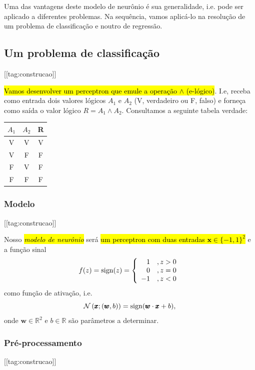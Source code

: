 Uma das vantagens deste modelo de neurônio é sua generalidade, i.e. pode ser aplicado a diferentes problemas. Na sequência, vamos aplicá-lo na resolução de um problema de classificação e noutro de regressão.


\subsection{Um problema de classificação}\label{cap_perceptron_ssec_classic}
[[tag:construcao]]

\hl{Vamos desenvolver um perceptron que emule a operação $\land$ (e-lógico)}. I.e, receba como entrada dois valores lógicos $A_1$ e $A_2$ (V, verdadeiro ou F, falso) e forneça como saída o valor lógico $R = A_1 \land A_2$. Consultamos a seguinte tabela verdade:

\begin{center}
  \begin{tabular}{cc|c}
    $A_1$ & $A_2$ & R\\\hline
    V & V & V\\
    V & F & F\\
    F & V & F\\
    F & F & F\\\hline
  \end{tabular}
\end{center}


\subsubsection{Modelo}
[[tag:construcao]]

Nosso \hl{\emph{modelo de neurônio}} será \hl{um perceptron com duas entradas $\pmb{x}\in \{-1,1\}^2$} e a função sinal
\begin{equation}
  f(z) = \operatorname{sign}(z) = \left\{
    \begin{array}{rr}
      1 &, z>0\\
      0 &, z=0\\
      -1 &, z<0
    \end{array}
\right.
\end{equation}
como função de ativação, i.e.
\begin{equation}
  \mathcal{N}\left(\pmb{x};(\pmb{w},b)\right) = \operatorname{sign}(\pmb{w}\cdot\pmb{x} + b),
\end{equation}
onde $\pmb{w}\in\mathbb{R}^2$ e $b\in\mathbb{R}$ são parâmetros a determinar.


\subsubsection{Pré-processamento}
[[tag:construcao]]

